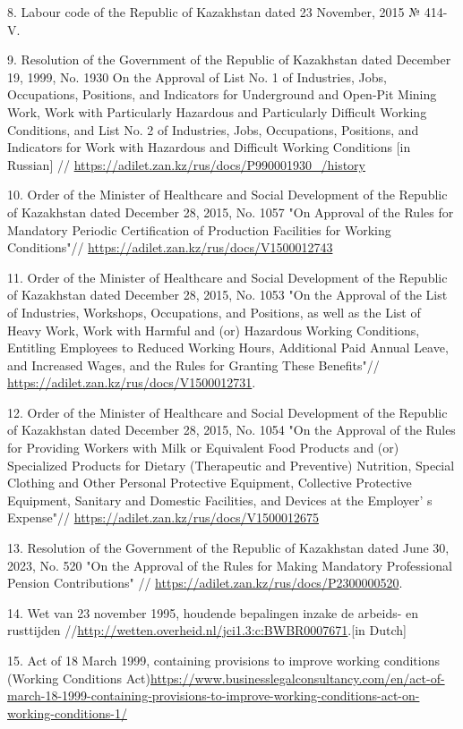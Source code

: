 8. Labour code of the Republic of Kazakhstan dated 23 November, 2015 №
414-V.

9. Resolution of the Government of the Republic of Kazakhstan dated
December 19, 1999, No. 1930 On the Approval of List No. 1 of Industries,
Jobs, Occupations, Positions, and Indicators for Underground and
Open-Pit Mining Work, Work with Particularly Hazardous and Particularly
Difficult Working Conditions, and List No. 2 of Industries, Jobs,
Occupations, Positions, and Indicators for Work with Hazardous and
Difficult Working Conditions {[}in Russian{]} //
\url{https://adilet.zan.kz/rus/docs/P990001930_/history}

10. Order of the Minister of Healthcare and Social Development of the
Republic of Kazakhstan dated December 28, 2015, No. 1057 "On Approval of
the Rules for Mandatory Periodic Certification of Production Facilities
for Working Conditions"//
\url{https://adilet.zan.kz/rus/docs/V1500012743}

11. Order of the Minister of Healthcare and Social Development of the
Republic of Kazakhstan dated December 28, 2015, No. 1053 "On the
Approval of the List of Industries, Workshops, Occupations, and
Positions, as well as the List of Heavy Work, Work with Harmful and (or)
Hazardous Working Conditions, Entitling Employees to Reduced Working
Hours, Additional Paid Annual Leave, and Increased Wages, and the Rules
for Granting These Benefits"//
\url{https://adilet.zan.kz/rus/docs/V1500012731}.

12. Order of the Minister of Healthcare and Social Development of the
Republic of Kazakhstan dated December 28, 2015, No. 1054 "On the
Approval of the Rules for Providing Workers with Milk or Equivalent Food
Products and (or) Specialized Products for Dietary (Therapeutic and
Preventive) Nutrition, Special Clothing and Other Personal Protective
Equipment, Collective Protective Equipment, Sanitary and Domestic
Facilities, and Devices at the Employer' s Expense"//
\url{https://adilet.zan.kz/rus/docs/V1500012675}

13. Resolution of the Government of the Republic of Kazakhstan dated
June 30, 2023, No. 520 "On the Approval of the Rules for Making
Mandatory Professional Pension Contributions" //
\url{https://adilet.zan.kz/rus/docs/P2300000520}.

14. Wet van 23 november 1995, houdende bepalingen inzake de arbeids- en
rusttijden //\url{http://wetten.overheid.nl/jci1.3:c:BWBR0007671}.{[}in
Dutch{]}

15. Act of 18 March 1999, containing provisions to improve working
conditions (Working Conditions
Act)\url{https://www.businesslegalconsultancy.com/en/act-of-march-18-1999-containing-provisions-to-improve-working-conditions-act-on-working-conditions-1/}

